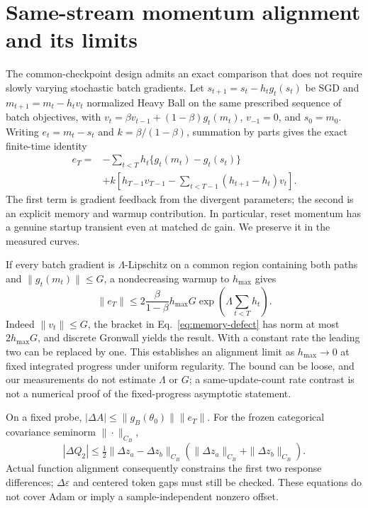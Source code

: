 \section{Same-stream momentum alignment and its limits}
\label{sec:alignment-theory}

The common-checkpoint design admits an exact comparison that does not require slowly varying stochastic batch gradients.  Let \(s_{t+1}=s_t-h_tg_t(s_t)\) be SGD and \(m_{t+1}=m_t-h_tv_t\) normalized Heavy Ball on the same prescribed sequence of batch objectives, with
\(v_t=\beta v_{t-1}+(1-\beta)g_t(m_t)\), \(v_{-1}=0\), and \(s_0=m_0\).
Writing \(e_t=m_t-s_t\) and \(k=\beta/(1-\beta)\), summation by parts gives the exact finite-time identity
\begin{align}
 e_T={}&-\sum_{t<T}h_t\{g_t(m_t)-g_t(s_t)\} \nonumber\\
 &+k\left[h_{T-1}v_{T-1}-\sum_{t<T-1}(h_{t+1}-h_t)v_t\right].
 \label{eq:memory-defect}
\end{align}
The first term is gradient feedback from the divergent parameters; the second is an explicit memory and warmup contribution.  In particular, reset momentum has a genuine startup transient even at matched dc gain.  We preserve it in the measured curves.

If every batch gradient is \(\Lambda\)-Lipschitz on a common region containing both paths and \(\|g_t(m_t)\|\le G\), a nondecreasing warmup to \(h_{\max}\) gives
\begin{equation}
 \|e_T\|\le 2\frac{\beta}{1-\beta}h_{\max}G
   \exp\!\left(\Lambda\sum_{t<T}h_t\right).
 \label{eq:momentum-bound}
\end{equation}
Indeed \(\|v_t\|\le G\), the bracket in Eq.~\eqref{eq:memory-defect} has norm at most \(2h_{\max}G\), and discrete Gronwall yields the result.  With a constant rate the leading two can be replaced by one.  This establishes an alignment limit as \(h_{\max}\to0\) at fixed integrated progress under uniform regularity.  The bound can be loose, and our measurements do not estimate \(\Lambda\) or \(G\); a same-update-count rate contrast is not a numerical proof of the fixed-progress asymptotic statement.

On a fixed probe, \(|\Delta A|\le\|g_B(\theta_0)\|\|e_T\|\).
For the frozen categorical covariance seminorm \(\|\cdot\|_{C_B}\),
\begin{equation}
 |\Delta Q_2|\le\tfrac12\|\Delta z_a-\Delta z_b\|_{C_B}
    (\|\Delta z_a\|_{C_B}+\|\Delta z_b\|_{C_B}).
 \label{eq:variance-bound}
\end{equation}
Actual function alignment consequently constrains the first two response differences; \(\Delta\varepsilon\) and centered token gaps must still be checked.  These equations do not cover Adam or imply a sample-independent nonzero offset.
